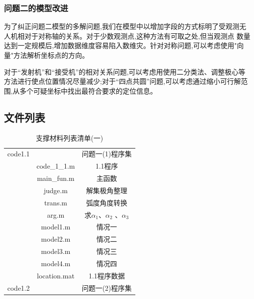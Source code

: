 \documentclass[withoutpreface,bwprint]{cumcmthesis}
\begin{document}
	\subsubsection{问题二的模型改进}	
	
	为了纠正问题二模型的多解问题,我们在模型中以增加字段的方式标明了受观测无人机相对于对称轴的关系。对于少数观测点,这种方法有可取之处,但当观测点
	数量达到一定规模后,增加数据维度容易陷入数维灾。针对对称问题,可以考虑使用"向量"方法解析坐标点的方向。
	
	对于“发射机”和“接受机”的相对关系问题,可以考虑用使用二分类法、调整极心等方法进行使点位置情况尽量减少;对于“四点共圆”问题,可以考虑通过缩小可行解范围,从多个可疑坐标中找出最符合要求的定位信息。
	
	
	\newpage
	
	\newpage
	\begin{appendices}
		\section{文件列表}
		\begin{table}[htbp]
			\renewcommand\arraystretch{0.1}
			\tabcolsep=0.2cm
			\centering
			\caption{支撑材料列表清单(一)}
			\begin{tabular}{ccc}
				\toprule[1.5pt]
				\makebox[0.27\textwidth][c]{文件夹名}	& \makebox[0.3\textwidth][c]{文件夹内容}	& \makebox[0.4\textwidth][c]{文件描述} \\ 
				\midrule
				code1.1	& & 问题一(1)程序集 \\
				&code\_1\_1.m  & 1.1程序 \\
				
				&main\_fun.m  & 主函数\\
				
				&judge.m  & 解集极角整理\\
				
				&trans.m  & 弧度角度转换 \\
				&arg.m & 求$\alpha_{1}$、$\alpha_{2}$ 、$\alpha_{3}$  \\
				&model1.m  & 情况一 \\
				&model2.m  & 情况二 \\
				&model3.m  & 情况三 \\
				&model4.m  & 情况四 \\
				&location.mat  & 1.1程序数据 \\
				
				code1.2	&& 问题一(2)程序集 \\
				

\end{tabular}
\end{table}
\end{appendices}
\end{document}

